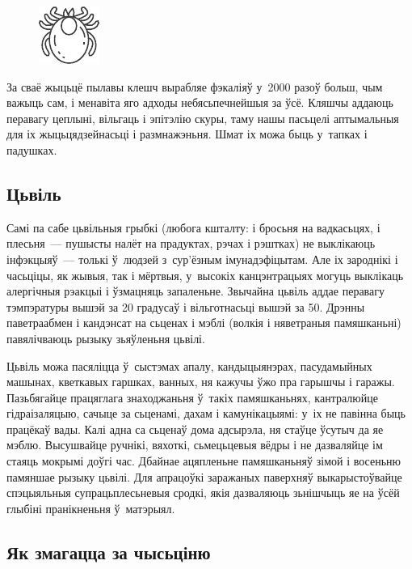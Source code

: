 \begin{figure}[htb!]
  \centering
  \includegraphics[scale=1.5]{willpower/ch11/9.pdf}
\end{figure}

За сваё жыцьцё пылавы клешч вырабляе фэкаліяў у~2000 разоў больш, чым важыць сам, і менавіта яго адходы небясьпечнейшыя за ўсё. Кляшчы аддаюць перавагу цеплыні, вільгаць і эпітэлію скуры, таму нашы пасьцелі аптымальныя для іх жыцьцядзейнасьці і размнажэньня. Шмат іх можа быць у~тапках і падушках.

\subsection*{Цьвіль}

Самі па сабе цьвільныя грыбкі (любога кшталту: і бросьня на вадкасьцях, і плесьня~--- пушысты налёт на прадуктах, рэчах і рэштках) не выклікаюць інфэкцыяў~--- толькі ў~людзей з~сур'ёзным імунадэфіцытам. Але іх зароднікі і часьціцы, як жывыя, так і мёртвыя, у~высокіх канцэнтрацыях могуць выклікаць алергічныя рэакцыі і ўзмацняць запаленьне. Звычайна цьвіль аддае перавагу тэмпэратуры вышэй за 20 градусаў і вільготнасьці вышэй за 50. Дрэнны паветраабмен і кандэнсат на сьценах і мэблі (волкія і няветраныя памяшканьні) павялічваюць рызыку зьяўленьня цьвілі.

Цьвіль можа пасяліцца ў~сыстэмах апалу, кандыцыянэрах, пасудамыйных машынах, кветкавых гаршках, ванных, ня кажучы ўжо пра гарышчы і гаражы. Пазьбягайце працяглага знаходжаньня ў~такіх памяшканьнях, кантралюйце гідраізаляцыю, сачыце за сьценамі, дахам і камунікацыямі: у~іх не павінна быць працёкаў вады. Калі адна са сьценаў дома адсырэла, ня стаўце ўсутыч да яе мэблю. Высушвайце ручнікі, вяхоткі, сьмецьцевыя вёдры і не дазваляйце ім стаяць мокрымі доўгі час. Дбайнае ацяпленьне памяшканьняў зімой і восеньню памяншае рызыку цьвілі. Для апрацоўкі заражаных паверхняў выкарыстоўвайце спэцыяльныя супрацьплесьневыя сродкі, якія дазваляюць зьнішчыць яе на ўсёй глыбіні пранікненьня ў~матэрыял.

\subsection*{Як змагацца за чысьціню}

